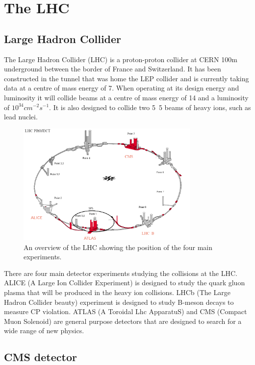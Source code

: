 \chapter{The LHC}
\section{Large Hadron Collider}
The Large Hadron Collider (LHC) is a proton-proton collider at CERN 100m
underground between the border of France and Switzerland.
It has been constructed in the tunnel that was home the LEP collider and is
currently taking data at a centre of mass energy of \unit{7}{\TeV}. 
When operating at its design energy and luminosity it will collide beams at a
centre of mass energy of \unit{14}{\TeV} and a luminosity of $10^34
cm^{-2}s^{-1}$.  
It is also designed to collide two \unit{5.5}{\TeV} beams of heavy ions, such
as lead nuclei.\cite{lhc}

\begin{figure}[htb!]
  \centering
  \includegraphics[width=0.8\textwidth]{LHC}
  \caption{An overview of the LHC showing the position of the four main experiments.}
  \label{fig:LHC}
\end{figure}

There are four main detector experiments studying the collisions at the LHC. 
ALICE (A Large Ion Collider Experiment) is designed to study the quark gluon
plasma that will be produced in the heavy ion collisions. 
LHCb (The Large Hadron Collider beauty) experiment is designed to study B-meson
decays to measure CP violation. 
ATLAS (A Toroidal Lhc ApparatuS) and CMS (Compact Muon Solenoid) are general
purpose detectors that are designed 
to search for a wide range of new physics.\cite{lhc}

\section{CMS detector}

